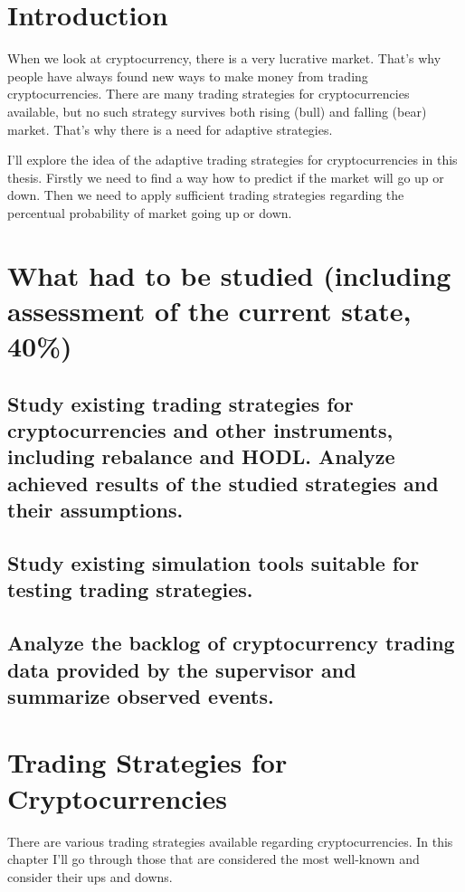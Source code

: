 
\chapter{Introduction}

When we look at cryptocurrency, there is a very lucrative market. That's why people have always found new ways to make money from trading cryptocurrencies. There are many trading strategies for cryptocurrencies available, but no such strategy survives both rising (bull) and falling (bear) market. That's why there is a need for adaptive strategies.

I'll explore the idea of the adaptive trading strategies for cryptocurrencies in this thesis. Firstly we need to find a way how to predict if the market will go up or down. Then we need to apply sufficient trading strategies regarding the percentual probability of market going up or down.


\chapter{What had to be studied (including assessment of the current state, 40\%)}

\section{Study existing trading strategies for cryptocurrencies and other instruments, including rebalance and HODL. Analyze achieved results of the studied strategies and their assumptions.}

\section{Study existing simulation tools suitable for testing trading strategies.}

\section{Analyze the backlog of cryptocurrency trading data provided by the supervisor and summarize observed events.}

\chapter{Trading Strategies for Cryptocurrencies}

There are various trading strategies available regarding cryptocurrencies.
In this chapter I'll go through those that are considered the most well-known and consider
their ups and downs.

